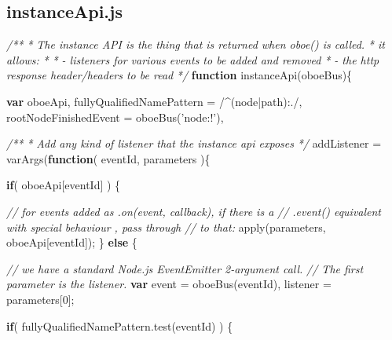 \documentclass[12pt, ]{article}
\newenvironment{Shaded}{}{}
\newcommand{\KeywordTok}[1]{\textcolor[rgb]{0.00,0.44,0.13}{\textbf{{#1}}}}
\newcommand{\DecValTok}[1]{\textcolor[rgb]{0.25,0.63,0.44}{{#1}}}
\newcommand{\FloatTok}[1]{\textcolor[rgb]{0.25,0.63,0.44}{{#1}}}
\newcommand{\StringTok}[1]{\textcolor[rgb]{0.25,0.44,0.63}{{#1}}}
\newcommand{\CommentTok}[1]{\textcolor[rgb]{0.38,0.63,0.69}{\textit{{#1}}}}
\newcommand{\OtherTok}[1]{\textcolor[rgb]{0.00,0.44,0.13}{{#1}}}
\newcommand{\FunctionTok}[1]{\textcolor[rgb]{0.02,0.16,0.49}{{#1}}}
\newcommand{\NormalTok}[1]{{#1}}
\begin{document}
\pagebreak

\subsection{instanceApi.js}\label{headerux5finstanceApi}

\label{src_instanceApi}

\begin{Shaded}
\begin{Highlighting}[]
\CommentTok{/** }
\CommentTok{ * The instance API is the thing that is returned when oboe() is called.}
\CommentTok{ * it allows:}
\CommentTok{ * }
\CommentTok{ *    - listeners for various events to be added and removed}
\CommentTok{ *    - the http response header/headers to be read}
\CommentTok{ */}
\KeywordTok{function} \FunctionTok{instanceApi}\NormalTok{(oboeBus)\{}

   \KeywordTok{var} \NormalTok{oboeApi,}
       \NormalTok{fullyQualifiedNamePattern = }\OtherTok{/}\FloatTok{^(}\OtherTok{node}\FloatTok{|}\OtherTok{path}\FloatTok{)}\OtherTok{:./}\NormalTok{,}
       \NormalTok{rootNodeFinishedEvent = }\FunctionTok{oboeBus}\NormalTok{(}\StringTok{'node:!'}\NormalTok{),}

       \CommentTok{/**}
\CommentTok{        * Add any kind of listener that the instance api exposes }
\CommentTok{        */}          
       \NormalTok{addListener = }\FunctionTok{varArgs}\NormalTok{(}\KeywordTok{function}\NormalTok{( eventId, parameters )\{}
             
            \KeywordTok{if}\NormalTok{( oboeApi[eventId] ) \{}
       
               \CommentTok{// for events added as .on(event, callback), if there is a }
               \CommentTok{// .event() equivalent with special behaviour , pass through}
               \CommentTok{// to that: }
               \FunctionTok{apply}\NormalTok{(parameters, oboeApi[eventId]);                     }
            \NormalTok{\} }\KeywordTok{else} \NormalTok{\{}
       
               \CommentTok{// we have a standard Node.js EventEmitter 2-argument call.}
               \CommentTok{// The first parameter is the listener.}
               \KeywordTok{var} \NormalTok{event = }\FunctionTok{oboeBus}\NormalTok{(eventId),}
                   \NormalTok{listener = parameters[}\DecValTok{0}\NormalTok{];}
       
               \KeywordTok{if}\NormalTok{( }\OtherTok{fullyQualifiedNamePattern}\NormalTok{.}\FunctionTok{test}\NormalTok{(eventId) ) \{}
                

\end{Highlighting}
\end{Shaded}
\end{document}
